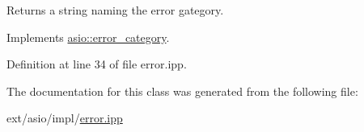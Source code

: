 Returns a string naming the error gategory. 



Implements \hyperlink{classasio_1_1error__category_a556b6099e1cc2d1cfb22e4ef2c9b0947}{asio\+::error\+\_\+category}.



Definition at line 34 of file error.\+ipp.



The documentation for this class was generated from the following file\+:\begin{DoxyCompactItemize}
\item 
ext/asio/impl/\hyperlink{impl_2error_8ipp}{error.\+ipp}\end{DoxyCompactItemize}
